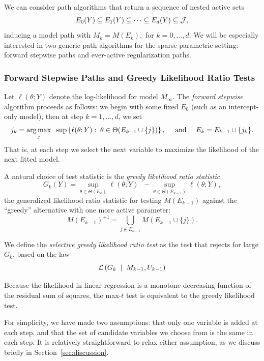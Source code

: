 \documentclass{article}
\begin{document}
We can consider path algorithms that return a sequence of nested active sets
\[
E_0(Y) \subseteq E_1(Y) \subseteq \cdots \subseteq E_d(Y) \subseteq \mathcal{J},
\]
inducing a model path with $M_k = M(E_k),$ for $k=0,\ldots,d$. We will be especially interested in two generic path algorithms for the sparse parametric setting: forward stepwise paths and ever-active regularization paths.

\subsubsection{Forward Stepwise Paths and Greedy Likelihood Ratio Tests}
Let $\ell(\theta; Y)$ denote the log-likelihood for model
$M_\infty$. The {\em forward stepwise} algorithm proceeds as follows: we begin with some fixed $E_0$ (such as an intercept-only model), then at step $k=1,\ldots,d$, we set
\begin{equation}
j_k = \operatorname*{arg\,max}_j \;\;\sup \left\{\ell(\theta; Y):\; \theta\in\Theta(E_{k-1} \cup \{j\})\right\}, \quad \text{ and } \quad
E_k = E_{k-1} \cup \{j_k\}.
\end{equation}
That is, at each step we select the next variable to maximize the likelihood of the next fitted model.

A natural choice of test statistic is the {\em greedy likelihood ratio statistic}
\begin{equation}\label{eq:greedyLRT}
G_k(Y) = \sup_{\theta\in \Theta(E_k)} {\ell(\theta; Y)} \;\;- \sup_{\theta\in \Theta(E_{k-1})} {\ell(\theta; Y)},
\end{equation}
the generalized likelihood ratio statistic for testing $M(E_{k-1})$ against the ``greedy'' alternative with one more active parameter:
\begin{equation}\label{eq:greedyAlternative}
M(E_{k-1})^{+1} = \bigcup_{j \notin E_{k-1}} M(E_{k-1} \cup \{j\}).
\end{equation}

We define the {\em selective greedy likelihood ratio test} as the test that rejects for large $G_k$, based on the law
\begin{equation}
\mathcal{L}\left(G_k \;\mid\; M_{k-1}, U_{k-1}\right)
\end{equation}

Because the likelihood in linear regression is a monotone decreasing function of the residual sum of squares, the max-$t$ test is equivalent to the greedy likelihood test.

For simplicity, we have made two assumptions: that only one variable is added at each step, and that the set of candidate variables we choose from is the same in each step. It is relatively straightforward to relax either assumption, as we discuss briefly in Section~\ref{sec:discussion}.
\end{document}
